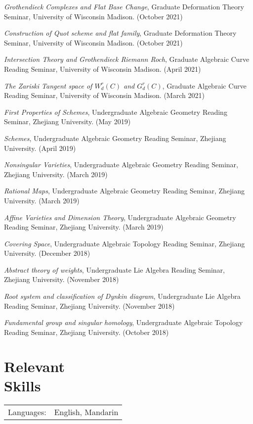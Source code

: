 \documentclass[margin,line,pifont,palatino,courier]{res}
\begin{document}
\begin{resume}
\emph{Grothendieck Complexes and Flat Base Change}, Graduate Deformation Theory Seminar,
University of Wisconsin Madison. (October  2021)

\emph{Construction of Quot scheme and flat family}, Graduate Deformation Theory Seminar,
University of Wisconsin Madison. (October  2021)

\emph{Intersection Theory and Grothendieck Riemann Roch}, Graduate Algebraic Curve Reading Seminar,
University of Wisconsin Madison. (April  2021)

\emph{The Zariski Tangent space of $W^r_d(C)$ and $G^r_d(C)$}, Graduate Algebraic Curve Reading Seminar,
University of Wisconsin Madison. (March 2021)


\emph{First Properties of Schemes}, Undergraduate Algebraic Geometry Reading Seminar,
Zhejiang University. (May 2019)

\emph{Schemes}, Undergraduate Algebraic Geometry Reading Seminar,
Zhejiang University. (April 2019)

\emph{Nonsingular Varieties}, Undergraduate Algebraic Geometry Reading Seminar,
Zhejiang University. (March 2019)

\emph{Rational Maps}, Undergraduate Algebraic Geometry Reading Seminar,
Zhejiang University. (March 2019)

\emph{Affine Varieties and Dimension Theory}, Undergraduate Algebraic Geometry Reading Seminar,
Zhejiang University. (March 2019)

\emph{Covering Space}, Undergraduate Algebraic Topology Reading Seminar,
Zhejiang University. (December 2018)

\emph{Abstract theory of weights}, Undergraduate Lie Algebra Reading Seminar,
Zhejiang University. (November 2018)

\emph{Root system and classification of Dynkin diagram}, Undergraduate Lie Algebra Reading Seminar,
Zhejiang University. (November 2018)

\emph{Fundamental group and singular homology}, Undergraduate Algebraic Topology Reading Seminar,
Zhejiang University. (October 2018)




\bigskip




\section{\sc Relevant \\ Skills}

\begin{tabular}{@{}p{0.8in}p{6in}}

Languages:& English, Mandarin\\

\end{tabular}





\end{resume}
\end{document}
